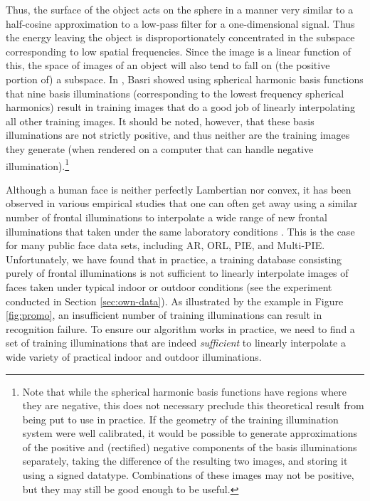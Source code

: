 Thus, the surface of the object acts on the sphere in a manner very similar to
a half-cosine approximation to a low-pass filter for a one-dimensional signal.
Thus the energy leaving the object is disproportionately concentrated in the
subspace corresponding to low spatial frequencies.  Since the image is a linear
function of this, the space of images of an object will also tend to fall on
(the positive portion of) a subspace.   In \cite{Basri2003-PAMI}, Basri showed
using spherical harmonic basis functions that nine basis illuminations
(corresponding to the lowest frequency spherical harmonics) result in training
images that do a good job of linearly interpolating all other training images.
It should be noted, however, that these basis illuminations are not strictly
positive, and thus neither are the training images they generate (when rendered
on a computer that can handle negative illumination).\footnote{Note that
while the spherical harmonic basis functions have regions where they are
negative, this does not necessary preclude this theoretical result from being
put to use in practice.  If the geometry of the training illumination system
were well calibrated, it would be possible to generate approximations of the
positive and (rectified) negative components of the basis illuminations
separately, taking the difference of the resulting two images, and storing it
using a signed datatype.  Combinations of these images may not be positive, but
they may still be good enough to be useful.}

Although a human face is neither perfectly Lambertian nor convex, it has been
observed in various empirical studies that one can often get away using a
similar number of frontal illuminations to interpolate a wide range of new
frontal illuminations that taken under the same laboratory conditions
\cite{Georghiades2001-PAMI}. This is the case for many public face data sets,
including AR, ORL, PIE, and Multi-PIE.  Unfortunately, we have found that in
practice, a training database consisting purely of frontal illuminations is not
sufficient to linearly interpolate images of faces taken under typical indoor
or outdoor conditions (see the experiment conducted in Section
\ref{sec:own-data}). As illustrated by the example in Figure \ref{fig:promo},
an insufficient number of training illuminations can result in recognition
failure.  To ensure our algorithm works in practice, we need to find a set of
training illuminations that are indeed {\em sufficient} to linearly interpolate
a wide variety of practical indoor and outdoor illuminations.


